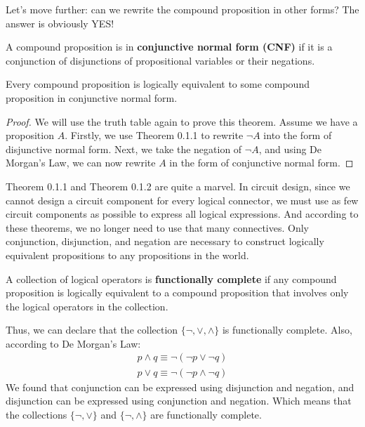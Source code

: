 Let's move further: can we rewrite the compound proposition in other forms? The answer is obviously YES!

\begin{definition}
A compound proposition is in \textbf{conjunctive normal form (CNF)} if it is a conjunction of disjunctions of propositional variables or their negations.
\end{definition}

\begin{theorem}
Every compound proposition is logically equivalent to some compound proposition in conjunctive normal form.
\end{theorem}
\begin{proof}
We will use the truth table again to prove this theorem. Assume we have a proposition $A$. Firstly, we use Theorem 0.1.1 to rewrite $\neg A$ into the form of disjunctive normal form. Next, we take the negation of $\neg A$, and using De Morgan’s Law, we can now rewrite $A$ in the form of conjunctive normal form.
\end{proof}

Theorem 0.1.1 and Theorem 0.1.2 are quite a marvel. In circuit design, since we cannot design a circuit component for every logical connector, we must use as few circuit components as possible to express all logical expressions. And according to these theorems, we no longer need to use that many connectives. Only conjunction, disjunction, and negation are necessary to construct logically equivalent propositions to any propositions in the world.

\begin{definition}
A collection of logical operators is \textbf{functionally complete} if any compound proposition is logically equivalent to a compound proposition that involves only the logical operators in the collection.
\end{definition}

Thus, we can declare that the collection $\{\neg, \vee, \wedge\}$ is functionally complete. Also, according to De Morgan’s Law:
\begin{align*}
    p \wedge q \equiv \neg(\neg p \vee \neg q) \\
    p \vee q \equiv \neg(\neg p \wedge \neg q)
\end{align*}
We found that conjunction can be expressed using disjunction and negation, and disjunction can be expressed using conjunction and negation. Which means that the collections $\{\neg, \vee\}$ and $\{\neg, \wedge\}$ are functionally complete.


